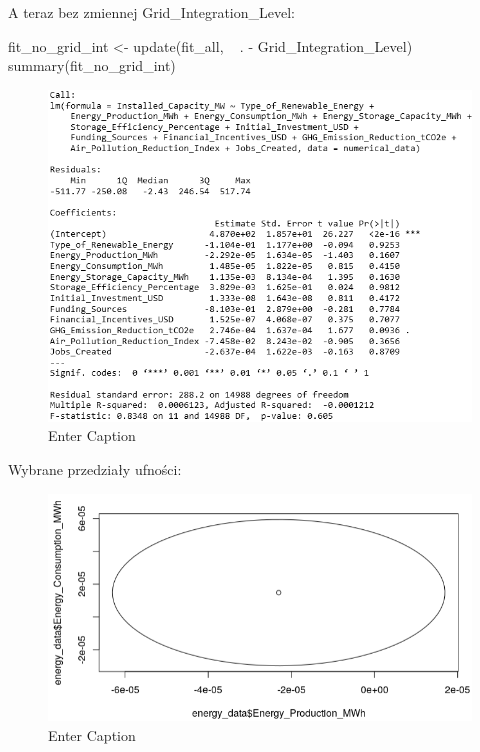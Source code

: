 A teraz bez zmiennej Grid\_Integration\_Level:

\begin{Rcode}
fit_no_grid_int <- update(fit_all, ~ . - Grid_Integration_Level)
summary(fit_no_grid_int)
\end{Rcode}

\begin{figure}[H]
    \centering
    \includegraphics[width=1\linewidth]{lab1/obraz12.png}
    \caption{Enter Caption}
    \label{fig:enter-label}
\end{figure}

Wybrane przedziały ufności:

\begin{figure}[H]
    \centering
    \includegraphics[width=1\linewidth]{lab1/obraz13.png}
    \caption{Enter Caption}
    \label{fig:enter-label}
\end{figure}

